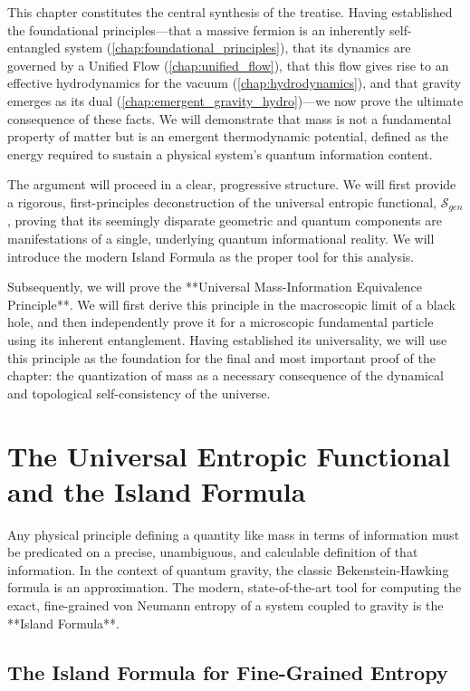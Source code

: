 \documentclass[11pt, letterpaper]{report}
\theoremstyle{plain} %
\theoremstyle{definition} %
\theoremstyle{remark} %
\begin{document}
This chapter constitutes the central synthesis of the treatise. Having established the foundational principles—that a massive fermion is an inherently self-entangled system (\cref{chap:foundational_principles}), that its dynamics are governed by a Unified Flow (\cref{chap:unified_flow}), that this flow gives rise to an effective hydrodynamics for the vacuum (\cref{chap:hydrodynamics}), and that gravity emerges as its dual (\cref{chap:emergent_gravity_hydro})—we now prove the ultimate consequence of these facts. We will demonstrate that mass is not a fundamental property of matter but is an emergent thermodynamic potential, defined as the energy required to sustain a physical system's quantum information content.

The argument will proceed in a clear, progressive structure. We will first provide a rigorous, first-principles deconstruction of the universal entropic functional, $\mathcal{S}_{gen}$, proving that its seemingly disparate geometric and quantum components are manifestations of a single, underlying quantum informational reality. We will introduce the modern Island Formula as the proper tool for this analysis.

Subsequently, we will prove the **Universal Mass-Information Equivalence Principle**. We will first derive this principle in the macroscopic limit of a black hole, and then independently prove it for a microscopic fundamental particle using its inherent entanglement. Having established its universality, we will use this principle as the foundation for the final and most important proof of the chapter: the quantization of mass as a necessary consequence of the dynamical and topological self-consistency of the universe.

\section{The Universal Entropic Functional and the Island Formula}
\label{sec:universal_entropic_functional}

Any physical principle defining a quantity like mass in terms of information must be predicated on a precise, unambiguous, and calculable definition of that information. In the context of quantum gravity, the classic Bekenstein-Hawking formula is an approximation. The modern, state-of-the-art tool for computing the exact, fine-grained von Neumann entropy of a system coupled to gravity is the **Island Formula**.

\subsection{The Island Formula for Fine-Grained Entropy}
\label{subsec:island_formula}
\end{document}
